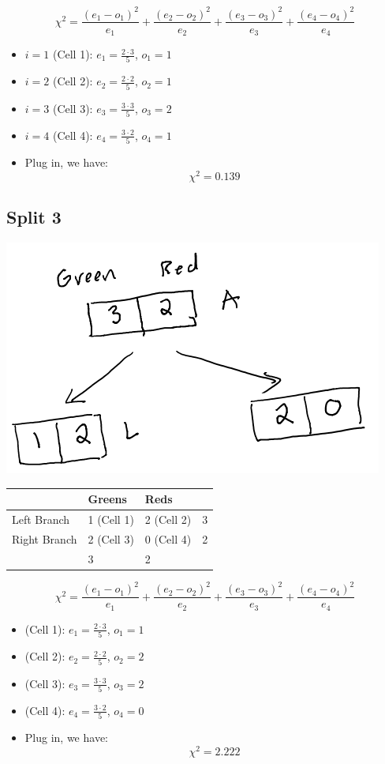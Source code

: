\documentclass[
]{article}
\begin{document}
\[\chi^2 = \frac{(e_1-o_1)^2}{e_1}+\frac{(e_2-o_2)^2}{e_2}+\frac{(e_3-o_3)^2}{e_3}+\frac{(e_4-o_4)^2}{e_4}\]

\begin{itemize}
\item
  \(i=1\) (Cell 1): \(e_1 = \frac{2\cdot 3}{5}\), \(o_1 = 1\)
\item
  \(i=2\) (Cell 2): \(e_2 = \frac{2\cdot 2}{5}\), \(o_2 = 1\)
\item
  \(i=3\) (Cell 3): \(e_3 = \frac{3\cdot 3}{5}\), \(o_3 = 2\)
\item
  \(i=4\) (Cell 4): \(e_4 = \frac{3\cdot 2}{5}\), \(o_4 = 1\)
\item
  Plug in, we have: \[\chi^2 = 0.139\]
\end{itemize}

\hypertarget{split-3}{%
\subsection{Split 3}\label{split-3}}

\includegraphics{images/im2.png}

\begin{longtable}[]{@{}llll@{}}
\toprule
& Greens & Reds & \\
\midrule
\endhead
Left Branch & 1 (Cell 1) & 2 (Cell 2) & 3 \\
Right Branch & 2 (Cell 3) & 0 (Cell 4) & 2 \\
& 3 & 2 & \\
\bottomrule
\end{longtable}

\[\chi^2 = \frac{(e_1-o_1)^2}{e_1}+\frac{(e_2-o_2)^2}{e_2}+\frac{(e_3-o_3)^2}{e_3}+\frac{(e_4-o_4)^2}{e_4}\]

\begin{itemize}
\item
  (Cell 1): \(e_1 = \frac{2\cdot 3}{5}\), \(o_1 = 1\)
\item
  (Cell 2): \(e_2 = \frac{2\cdot 2}{5}\), \(o_2 = 2\)
\item
  (Cell 3): \(e_3 = \frac{3\cdot 3}{5}\), \(o_3 = 2\)
\item
  (Cell 4): \(e_4 = \frac{3\cdot 2}{5}\), \(o_4 = 0\)
\item
  Plug in, we have: \[\chi^2 = 2.222\]
\end{itemize}
\end{document}
